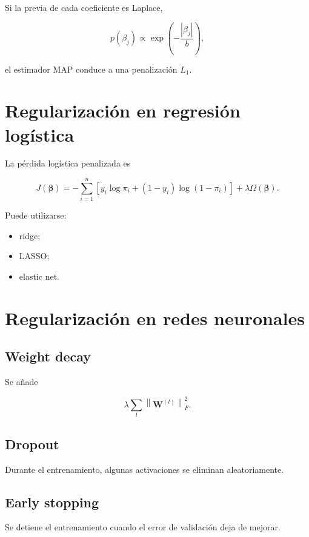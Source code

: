 \documentclass[
  spanish,
  11pt,
  letterpaper,
  DIV=11,
  numbers=noendperiod]{scrreprt}
\providecommand{\tightlist}{%
  \setlength{\itemsep}{0pt}\setlength{\parskip}{0pt}}
\theoremstyle{definition}
\theoremstyle{plain}
\theoremstyle{definition}
\theoremstyle{remark}
\begin{document}
Si la previa de cada coeficiente es Laplace,

\[
p(\beta_j)
\propto
\exp
\left(
-\frac{|\beta_j|}{b}
\right),
\]

el estimador MAP conduce a una penalización \(L_1\).

\section{Regularización en regresión
logística}\label{regularizaciuxf3n-en-regresiuxf3n-loguxedstica}

La pérdida logística penalizada es

\[
J(\boldsymbol{\beta})
=
-
\sum_{i=1}^{n}
\left[
y_i\log\pi_i
+
(1-y_i)\log(1-\pi_i)
\right]
+
\lambda
\Omega(\boldsymbol{\beta}).
\]

Puede utilizarse:

\begin{itemize}
\tightlist
\item
  ridge;
\item
  LASSO;
\item
  elastic net.
\end{itemize}

\section{Regularización en redes
neuronales}\label{regularizaciuxf3n-en-redes-neuronales}

\subsection{Weight decay}\label{weight-decay}

Se añade

\[
\lambda
\sum_l
\left\|
\mathbf{W}^{(l)}
\right\|_F^2.
\]

\subsection{Dropout}\label{dropout}

Durante el entrenamiento, algunas activaciones se eliminan
aleatoriamente.

\subsection{Early stopping}\label{early-stopping}

Se detiene el entrenamiento cuando el error de validación deja de
mejorar.
\end{document}
